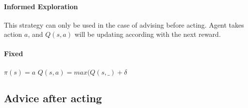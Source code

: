 \documentclass[a4paper,12pt]{article}
\begin{document}
       
       \paragraph{Informed Exploration}
       This strategy can only be used in the case of advising before acting. Agent takes action $a$,
       and $Q(s,a)$ will be updating according with the next reward.
       
       
       
       \paragraph{Fixed} 
	$\pi(s)=a$ \newline
	$Q(s,a) = max(Q(s,\_) + \delta$

      \subsection{Advice after acting}
%       
%             
%       
%       
\end{document}
